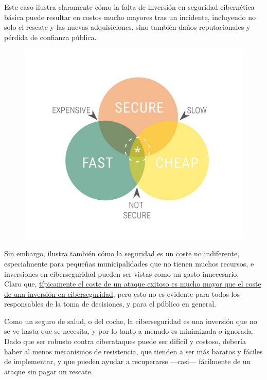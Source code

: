 Este caso ilustra claramente cómo la falta de inversión en seguridad cibernética básica puede resultar en costos mucho mayores tras un incidente, incluyendo no solo el rescate y las nuevas adquisiciones, sino también daños reputacionales y pérdida de confianza pública.

\begin{paracol}{2}
    

    \colfill
    \begin{figure}[htbp]
        \centering
        \includegraphics[width=0.85\columnwidth]{images/FSC.jpg}
        \label{fig:FSC}
    \end{figure}
    \colfill
    
    \switchcolumn
    Sin embargo, ilustra también cómo la \ul{seguridad es un coste no indiferente}, especialmente para pequeñas municipalidades que no tienen muchos recursos, e inversiones en ciberseguridad pueden ser vistas como un gasto innecesario.\\
    Claro que, \ul{típicamente el coste de un ataque exitoso es mucho mayor que el coste de una inversión en ciberseguridad}, pero esto no es evidente para todos los responsables de la toma de decisiones, y para el público en general.
    
    Como un seguro de salud, o del coche, la ciberseguridad es una inversión que no se ve hasta que se necesita, y por lo tanto a menudo es minimizada o ignorada.\\
    Dado que ser robusto contra ciberataques puede ser difícil y costoso, debería haber al menos mecanismos de resistencia, que tienden a ser más baratos y fáciles de implementar, y que pueden ayudar a recuperarse ---casi--- fácilmente de un ataque sin pagar un rescate.
    
\end{paracol}



